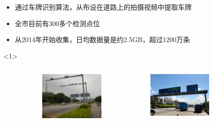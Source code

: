 \documentclass{beamerthemeMono}
\begin{document}
\begin{frame}[t]{\subsecname}
\begin{itemize}
\item<1-> 通过车牌识别算法，从布设在道路上的拍摄视频中提取车牌
\item<2-> 全市目前有300多个检测点位
\item<2-> 从2014年开始收集，日均数据量是约2.5GB，超过1200万条 
\end{itemize}


\begin{onlyenv}<1>
\begin{figure} \centering
\begin{columns}[b]
  \begin{column}{.5\textwidth}
    \begin{figure}\flushright
      \includegraphics[height=0.35\textheight]{chp02_车牌识别01.jpg}
    \end{figure}
  \end{column}
  \begin{column}{.5\textwidth}
    \begin{figure}\flushleft
      \includegraphics[height=0.35\textheight]{chp02_车牌识别02.jpg}

\end{figure}
\end{column}
\end{columns}
\end{figure}
\end{onlyenv}
\end{frame}
\end{document}
